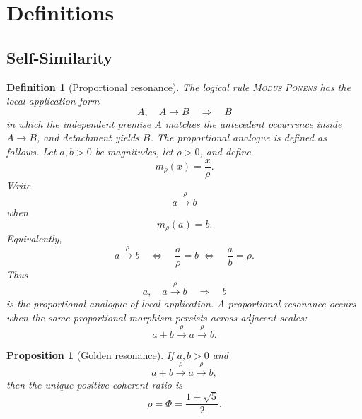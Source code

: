 \documentclass[letterpaper,10pt]{article}
\theoremstyle{upright}
\theoremstyle{upright}
\newtheorem{definition}[theorem]{Definition}
\newtheorem{proposition}[theorem]{Proposition}
\begin{document}
\section{Definitions}\label{sec:definitions}

\subsection{Self-Similarity}\label{subsec:self-similarity}

\begin{definition}[Proportional resonance]
	The logical rule \textsc{Modus Ponens} has the local application form
	\begin{equation}
		A,\quad A\to B \quad \Longrightarrow \quad B
	\end{equation}
	in which the independent premise $A$ matches the antecedent occurrence inside $A\to B$, and detachment yields $B$. The proportional analogue is defined as follows. Let $a,b>0$ be magnitudes, let $\rho>0$, and define
	\begin{equation}
		m_{\rho}(x)=\frac{x}{\rho}.
	\end{equation}
	Write
	\begin{equation}
		a\xrightarrow{\rho} b
	\end{equation}
	when
	\begin{equation}
		m_{\rho}(a)=b.
	\end{equation}
	Equivalently,
	\begin{equation}
		a\xrightarrow{\rho} b \quad \Longleftrightarrow \quad \frac{a}{\rho}=b\; \Longleftrightarrow \quad \frac{a}{b}=\rho.
	\end{equation}
	Thus
	\begin{equation}
		a,\quad a\xrightarrow{\rho} b \quad \Longrightarrow \quad b
	\end{equation}
	is the proportional analogue of local application. A proportional resonance occurs when the same proportional morphism persists across adjacent scales:
	\begin{equation}
		a+b \xrightarrow{\rho} a \xrightarrow{\rho} b.
	\end{equation}
\end{definition}

\begin{proposition}[Golden resonance]
	If $a,b>0$ and
	\begin{equation}
		a+b \xrightarrow{\rho} a \xrightarrow{\rho} b,
	\end{equation}
	then the unique positive coherent ratio is
	\begin{equation}
		\rho=\Phi=\frac{1+\sqrt5}{2}.
	\end{equation}
\end{proposition}
\end{document}
